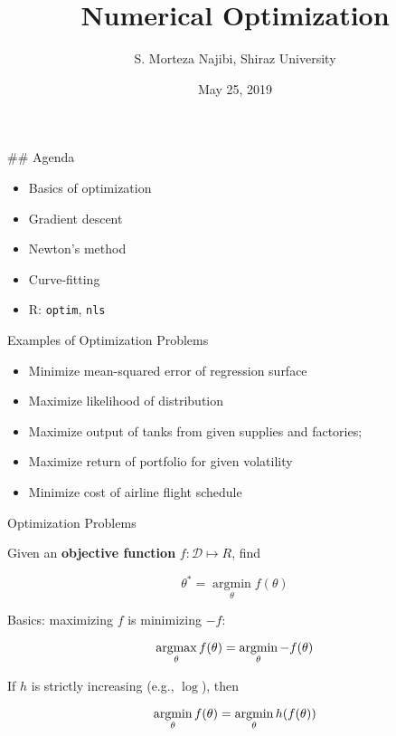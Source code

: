 \documentclass[8pt,ignorenonframetext,]{beamer}
\title{Numerical Optimization}
\author{S. Morteza Najibi, Shiraz University}
\date{May 25, 2019}
\providecommand{\tightlist}{%
  \setlength{\itemsep}{0pt}\setlength{\parskip}{0pt}}
\begin{document}
\frame{\titlepage}

\begin{frame}[fragile]

\#\# Agenda

\begin{itemize}
\tightlist
\item
  Basics of optimization
\item
  Gradient descent
\item
  Newton's method
\item
  Curve-fitting
\item
  R: \texttt{optim}, \texttt{nls}
\end{itemize}

\end{frame}

\begin{frame}{Examples of Optimization Problems}

\begin{itemize}
\tightlist
\item
  Minimize mean-squared error of regression surface
\item
  Maximize likelihood of distribution
\item
  Maximize output of tanks from given supplies and factories;
\item
  Maximize return of portfolio for given volatility
\item
  Minimize cost of airline flight schedule
\end{itemize}

\end{frame}

\begin{frame}{Optimization Problems}

Given an \textbf{objective function} \(f: \mathcal{D} \mapsto R\), find

\[
\DeclareMathOperator*{\argmax}{argmax}
\DeclareMathOperator*{\argmin}{argmin}
\theta^* = \argmin_{\theta}{f(\theta)}
\]

Basics: maximizing \(f\) is minimizing \(-f\):

\[
\argmax_{\theta}{f(\theta)}= \argmin_{\theta}{-f(\theta)}
\]

If \(h\) is strictly increasing (e.g., \(\log\)), then

\[
\argmin_{\theta}{f(\theta)} = \argmin_{\theta}{h(f(\theta))}
\]

\end{frame}
\end{document}
